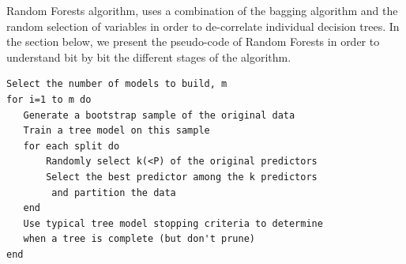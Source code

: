 \par  Random Forests algorithm, uses a combination of the bagging algorithm and the random selection of variables in order to de-correlate individual decision trees. 
In the section below, we present the pseudo-code of Random Forests in order to understand bit by bit the different stages of the algorithm. \newpage
{}
\begin{lstlisting}
Select the number of models to build, m
for i=1 to m do
   Generate a bootstrap sample of the original data
   Train a tree model on this sample
   for each split do
       Randomly select k(<P) of the original predictors
       Select the best predictor among the k predictors 
        and partition the data
   end
   Use typical tree model stopping criteria to determine 
   when a tree is complete (but don't prune)
end
\end{lstlisting}

